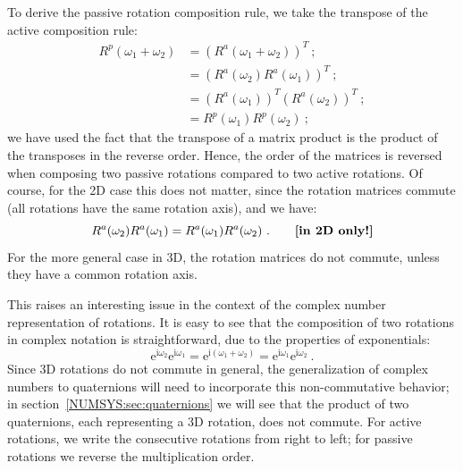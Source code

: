 To derive the passive rotation composition rule, we take the transpose of the active composition rule:
\begin{align*}
	R^p(\omega_1+\omega_2) &= \left(R^a(\omega_1+\omega_2)\right)^T\ ;\\ 
	&= \left(R^a(\omega_2)R^a(\omega_1)\right)^T\ ;\\
	&= \left(R^a(\omega_1)\right)^T\left(R^a(\omega_2)\right)^T\ ;\\
	&= R^p(\omega_1)R^p(\omega_2)\ ;
\end{align*}
we have used the fact that the transpose of a matrix product is the product of the transposes in the reverse order.  Hence, the order of the matrices is reversed when composing two passive rotations compared to two active rotations.  Of course, for the 2D case this does not matter, since the rotation matrices commute (all rotations have the same rotation axis), and we have:
\[
	R^a(\omega_2)R^a(\omega_1) = R^a(\omega_1)R^a(\omega_2)\ .\qquad\text{\textbf{[in 2D only!]}}
\]
For the more general case in 3D, the rotation matrices do not commute, unless they have a common rotation axis. 

This raises an interesting issue in the context of the complex number representation of rotations.  It is easy to see that the composition of two rotations in complex notation is straightforward, due to the properties of exponentials:
\[
	\mathrm{e}^{\mathrm{i}\omega_2}\mathrm{e}^{\mathrm{i}\omega_1}
	=\mathrm{e}^{\mathrm{i}(\omega_1+\omega_2)} = 
	\mathrm{e}^{\mathrm{i}\omega_1}\mathrm{e}^{\mathrm{i}\omega_2}\ .
\]	
Since 3D rotations do not commute in general, the generalization of complex numbers to quaternions will need to incorporate this non-commutative behavior; in section~\ref{NUMSYS:sec:quaternions} we will see that the product of two quaternions, each representing a 3D rotation, does not commute.  For active rotations, we write the consecutive rotations from right to left; for passive rotations we reverse the multiplication order.

